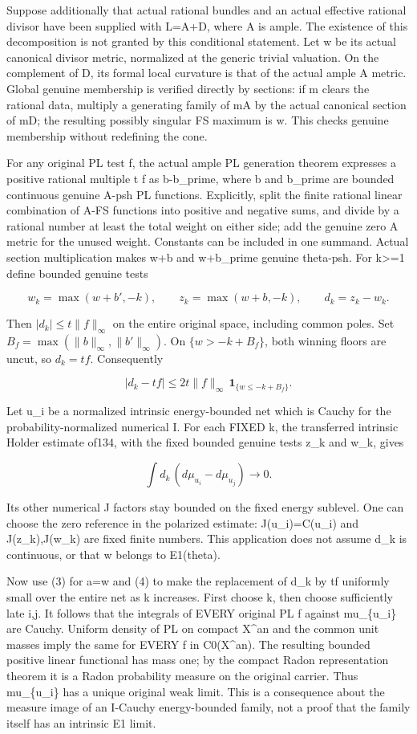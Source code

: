 \documentclass[
  10pt,
]{article}
\begin{document}
Suppose additionally that actual rational bundles and an actual
effective rational divisor have been supplied with L=A+D, where A is
ample. The existence of this decomposition is not granted by this
conditional statement. Let w be its actual canonical divisor metric,
normalized at the generic trivial valuation. On the complement of D, its
formal local curvature is that of the actual ample A metric. Global
genuine membership is verified directly by sections: if m clears the
rational data, multiply a generating family of mA by the actual
canonical section of mD; the resulting possibly singular FS maximum is
w. This checks genuine membership without redefining the cone.

For any original PL test f, the actual ample PL generation theorem
expresses a positive rational multiple t f as b-b\_prime, where b and
b\_prime are bounded continuous genuine A-psh PL functions. Explicitly,
split the finite rational linear combination of A-FS functions into
positive and negative sums, and divide by a rational number at least the
total weight on either side; add the genuine zero A metric for the
unused weight. Constants can be included in one summand. Actual section
multiplication makes w+b and w+b\_prime genuine theta-psh. For
k\textgreater=1 define bounded genuine tests

\[w_k=\max(w+b',-k),\qquad z_k=\max(w+b,-k),\qquad d_k=z_k-w_k.\]

Then \(|d_k|\leq t\|f\|_\infty\)
on the entire original space, including common poles. Set
\(B_f=\max(\|b\|_\infty,\|b'\|_\infty)\).
On \(\{w>-k+B_f\}\), both winning floors are uncut, so \(d_k=tf\).
Consequently

\[|d_k-tf|\leq2t\|f\|_\infty\,
\mathbf1_{\{w\leq-k+B_f\}}.\tag{4}\]

Let u\_i be a normalized intrinsic energy-bounded net which is Cauchy
for the probability-normalized numerical I. For each FIXED k, the
transferred intrinsic Holder estimate of134, with the fixed bounded
genuine tests z\_k and w\_k, gives

\[\int d_k\,(d\mu_{u_i}-d\mu_{u_j})\longrightarrow0.\]

Its other numerical J factors stay bounded on the fixed energy sublevel.
One can choose the zero reference in the polarized estimate:
J(u\_i)=C(u\_i) and J(z\_k),J(w\_k) are fixed finite numbers. This
application does not assume d\_k is continuous, or that w belongs to
E1(theta).

Now use (3) for a=w and (4) to make the replacement of d\_k by tf
uniformly small over the entire net as k increases. First choose k, then
choose sufficiently late i,j. It follows that the integrals of EVERY
original PL f against mu\_\{u\_i\} are Cauchy. Uniform density of PL on
compact X\^{}an and the common unit masses imply the same for EVERY f in
C0(X\^{}an). The resulting bounded positive linear functional has mass
one; by the compact Radon representation theorem it is a Radon
probability measure on the original carrier. Thus mu\_\{u\_i\} has a
unique original weak limit. This is a consequence about the measure
image of an I-Cauchy energy-bounded family, not a proof that the family
itself has an intrinsic E1 limit.
\end{document}

